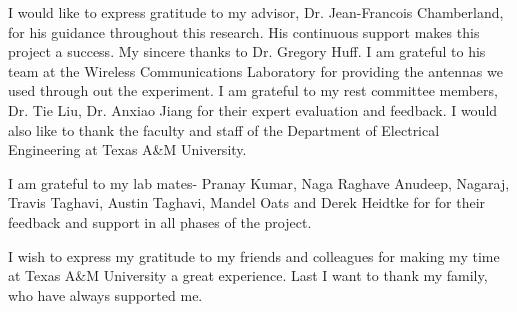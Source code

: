 \TAMUAcknowledgmentFormat

I would like to express gratitude to my advisor, Dr. Jean-Francois
Chamberland, for his guidance throughout this
research. His continuous support makes this project a success. 
My sincere thanks to Dr. Gregory Huff. I am grateful to his team at the Wireless Communications
Laboratory for providing the antennas we used through out the experiment.
I am grateful to my rest committee members, Dr. Tie Liu, Dr. Anxiao Jiang for their expert evaluation and feedback.
I would also like to thank the faculty and staff of the Department of Electrical Engineering at Texas A\&M University.

I am grateful to my lab mates- Pranay Kumar, Naga Raghave Anudeep, Nagaraj, Travis Taghavi, Austin Taghavi, Mandel Oats and Derek Heidtke for for their feedback and support in all phases of the project.

I wish to express my gratitude to my friends and colleagues for making my time
at Texas A\&M University a great experience. Last I want to thank
my family, who have always supported me.

